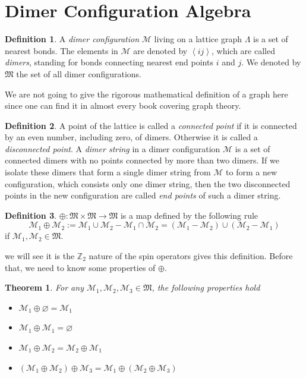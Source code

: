 \documentclass[12font]{article}
\newtheorem{theorem}{Theorem}[section]
\theoremstyle{definition}
\newtheorem{definition}{Definition}[section]
\numberwithin{equation}{section}
\newcommand{\anglelr}[1]{\left\langle #1 \right\rangle}
\begin{document}
\section{Dimer Configuration Algebra}
\begin{definition}
  A \emph{dimer configuration} $\mathcal{M}$ living on a lattice graph $\Lambda$ is a set of nearest bonds. The elements in $\mathcal{M}$ are denoted by $\anglelr{ij}$, which are called \emph{dimers}, standing for bonds connecting nearest end points $i$ and $j$. We denoted by $\mathfrak{M}$ the set of all dimer configurations.
\end{definition}
We are not going to give the rigorous mathematical definition of a graph here since one can find it in almost every book covering graph theory. 
\begin{definition}
  A point of the lattice is called a \emph{connected point} if it is connected by an even number, including zero, of dimers. Otherwise it is called a \emph{disconnected point}. A \emph{dimer string} in a dimer configuration $\mathcal{M}$ is a set of connected dimers with no points connected by more than two dimers. If we isolate these dimers that form a single dimer string from $\mathcal{M}$ to form a new configuration, which consists only one dimer string, then the two disconnected points in the new configuration are called \emph{end points} of such a dimer string.
\end{definition}
\begin{definition}
  $\oplus:\mathfrak{M}\times\mathfrak{M}\to\mathfrak{M}$ is a map defined by the following rule 
  \[\mathcal{M}_1\oplus\mathcal{M}_2 := \mathcal{M}_1\cup\mathcal{M}_2-\mathcal{M}_1\cap\mathcal{M}_2 = (\mathcal{M}_1-\mathcal{M}_2)\cup(\mathcal{M}_2-\mathcal{M}_1)\]
  if $\mathcal{M}_1,\mathcal{M}_2\in\mathfrak{M}$.
\end{definition}
we will see it is the $\mathbb{Z}_2$ nature of the spin operators gives this definition. Before that, we need to know some properties of $\oplus$.
\begin{theorem}
For any $\mathcal{M}_1,\mathcal{M}_2,\mathcal{M}_3\in\mathfrak{M}$, the following properties hold 
  \begin{itemize}
    \item $\mathcal{M}_1\oplus\varnothing = \mathcal{M}_1$
    \item $\mathcal{M}_1\oplus\mathcal{M}_1 = \varnothing$
    \item $\mathcal{M}_1\oplus\mathcal{M}_2 = \mathcal{M}_2\oplus\mathcal{M}_1$
    \item $(\mathcal{M}_1\oplus\mathcal{M}_2)\oplus\mathcal{M}_3 = \mathcal{M}_1\oplus(\mathcal{M}_2\oplus\mathcal{M}_3)$
  \end{itemize}
\end{theorem}
\end{document}
